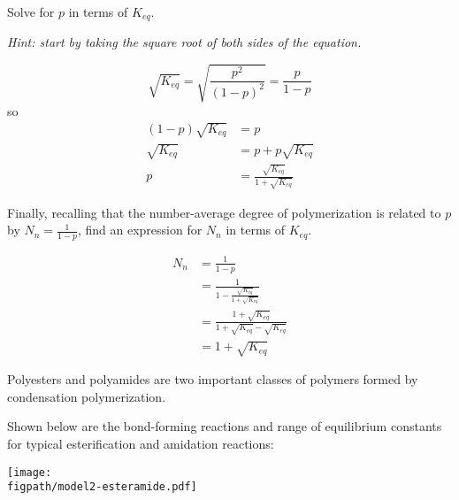 \begin{activity}
\begin{ctqs}
	\question Solve for $p$ in terms of $K_{eq}$.
	\label{\labelbase:ctq:Keqp}
		
		\emph{Hint: start by taking the square root of both sides of the equation.}
	
		\begin{solution}[3.25in]
			\begin{equation*}
				\sqrt{K_{eq}} = \sqrt{\frac{p^2}{(1-p)^2}} = \frac{p}{1-p}
			\end{equation*}
			so
			\begin{align*}
				(1-p)\sqrt{K_{eq}} &= p\\
				\sqrt{K_{eq}} &= p + p\sqrt{K_{eq}}  \\
				p &= \frac{\sqrt{K_{eq}}}{1+\sqrt{K_{eq}}}
			\end{align*}
		\end{solution}
	
	
	\question Finally, recalling that the number-average degree of polymerization is related to $p$ by $N_n = \frac{1}{1-p}$, find an expression for $N_n$ in terms of $K_{eq}$.
		
		\begin{solution}[4.5in]
			\begin{align*}
				N_n &= \frac{1}{1-p} \\
				&= \frac{1}{1-\frac{\sqrt{K_{eq}}}{1+\sqrt{K_{eq}}}}\\
				&= \frac{1+\sqrt{K_{eq}}}{1+\sqrt{K_{eq}} - \sqrt{K_{eq}}}\\
				&= 1+ \sqrt{K_{eq}}
			\end{align*}
		\end{solution}
		
\end{ctqs}
	
\clearpage %
\begin{model}
\label{\labelbase:mdl:K}

Polyesters and polyamides are two important classes of polymers formed by condensation polymerization.

Shown below are the bond-forming reactions and range of equilibrium constants for typical esterification and amidation reactions:
	
		\vspace{0.1in}
		\centerline{\texttt{[image: \\figpath/model2-esteramide.pdf]}}

\end{model}


\end{activity}
